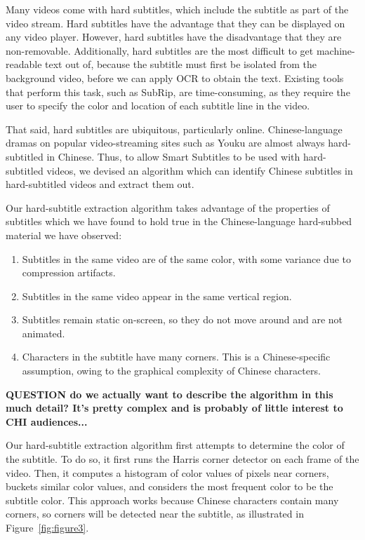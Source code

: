 \documentclass{sigchi}
\begin{document}
Many videos come with hard subtitles, which include the subtitle as part of the video stream. Hard subtitles have the advantage that they can be displayed on any video player. However, hard subtitles have the disadvantage that they are non-removable. Additionally, hard subtitles are the most difficult to get machine-readable text out of, because the subtitle must first be isolated from the background video, before we can apply OCR to obtain the text. Existing tools that perform this task, such as SubRip, are time-consuming, as they require the user to specify the color and location of each subtitle line in the video.

That said, hard subtitles are ubiquitous, particularly online. Chinese-language dramas on popular video-streaming sites such as Youku are almost always hard-subtitled in Chinese. Thus, to allow Smart Subtitles to be used with hard-subtitled videos, we devised an algorithm which can identify Chinese subtitles in hard-subtitled videos and extract them out.

Our hard-subtitle extraction algorithm takes advantage of the properties of subtitles which we have found to hold true in the Chinese-language hard-subbed material we have observed:

\begin{enumerate}[noitemsep]
\item Subtitles in the same video are of the same color, with some variance due to compression artifacts.
\item Subtitles in the same video appear in the same vertical region.
\item Subtitles remain static on-screen, so they do not move around and are not animated.
\item Characters in the subtitle have many corners. This is a Chinese-specific assumption, owing to the graphical complexity of Chinese characters.
\end{enumerate}

\textbf{QUESTION do we actually want to describe the algorithm in this
much detail? It's pretty complex and is probably of little interest to CHI audiences...}

Our hard-subtitle extraction algorithm first attempts to determine the color
of the subtitle. To do so, it first runs the Harris corner detector
on each frame of the video. Then, it computes a histogram of color values of pixels near corners, buckets similar color values, and considers the most frequent color to be the subtitle color. This approach works because Chinese characters contain many corners,
so corners will be detected near the subtitle, as illustrated
in Figure~\ref{fig:figure3}.
\end{document}
